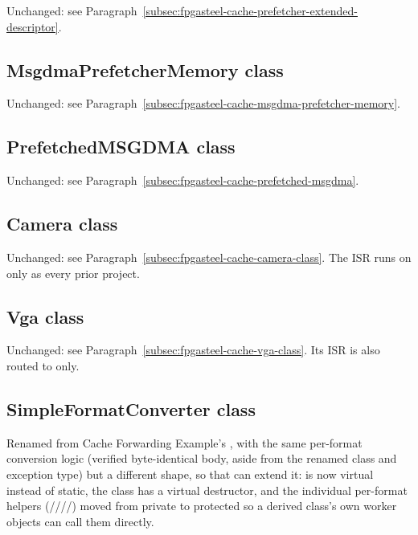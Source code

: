 Unchanged: see Paragraph~\ref{subsec:fpgasteel-cache-prefetcher-extended-descriptor}.

\subsection{MsgdmaPrefetcherMemory class}
\label{subsec:fpgasteel-dualcore-forwarding-msgdma-prefetcher-memory}

Unchanged: see Paragraph~\ref{subsec:fpgasteel-cache-msgdma-prefetcher-memory}.

\subsection{PrefetchedMSGDMA class}
\label{subsec:fpgasteel-dualcore-forwarding-prefetched-msgdma}

Unchanged: see Paragraph~\ref{subsec:fpgasteel-cache-prefetched-msgdma}.

\subsection{Camera class}
\label{subsec:fpgasteel-dualcore-forwarding-camera}

Unchanged: see Paragraph~\ref{subsec:fpgasteel-cache-camera-class}. The ISR runs on  only as every prior project.

\subsection{Vga class}
\label{subsec:fpgasteel-dualcore-forwarding-vga}

Unchanged: see Paragraph~\ref{subsec:fpgasteel-cache-vga-class}. Its ISR is also routed to  only.

\subsection{SimpleFormatConverter class}
\label{subsec:fpgasteel-dualcore-forwarding-simple-format-converter}

Renamed from Cache Forwarding Example's , with the same per-format conversion logic (verified byte-identical body, aside from the renamed class and exception type) but a different shape, so that  can extend it:  is now virtual instead of static, the class has a virtual destructor, and the individual per-format helpers (////) moved from private to protected so a derived class's own worker objects can call them directly.

